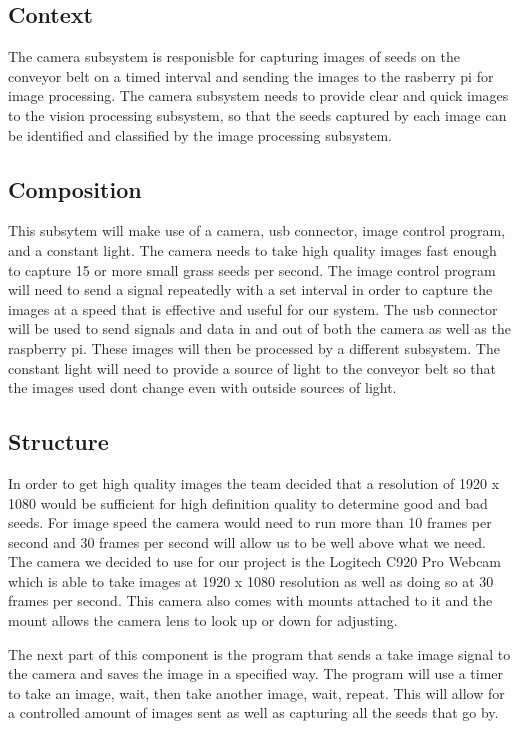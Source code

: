 \subsection{Context}

The camera subsystem is responisble for capturing images of seeds on the conveyor belt on a timed interval and sending the images to the rasberry pi for image processing. The camera subsystem needs to provide clear and quick images to the vision processing subsystem, so that the seeds captured by each image can be identified and classified by the image processing subsystem. 

\subsection{Composition}
This subsytem will make use of a camera, usb connector, image control program, and a constant light. The camera needs to take high quality images fast enough to capture 15 or more small grass seeds per second. The image control program will need to send a signal repeatedly with a set interval in order to capture the images at a speed that is effective and useful for our system. The usb connector will be used to send signals and data in and out of both the camera as well as the raspberry pi. These images will then be processed by a different subsystem. The constant light will need to provide a source of light to the conveyor belt so that the images used dont change even with outside sources of light.

\subsection{Structure}
In order to get high quality images the team decided that a resolution of 1920 x 1080 would be sufficient for high definition quality to determine good and bad seeds. For image speed the camera would need to run more than 10 frames per second and 30 frames per second will allow us to be well above what we need. The camera we decided to use for our project is the Logitech C920 Pro Webcam which is able to take images at 1920 x 1080 resolution as well as doing so at 30 frames per second. This camera also comes with mounts attached to it and the mount allows the camera lens to look up or down for adjusting. 

The next part of this component is the program that sends a take image signal to the camera and saves the image in a specified way. The program will use a timer to take an image, wait, then take another image, wait, repeat. This will allow for a controlled amount of images sent as well as capturing all the seeds that go by. 

